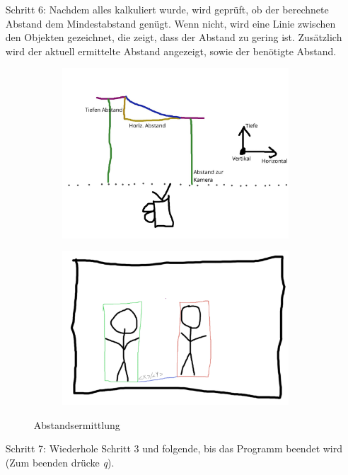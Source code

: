 \documentclass[12pt]{article}
\theoremstyle{definition}
\begin{document}
\begin{flushleft}
\begin{enumerate}
\item[Schritt 6:] Nachdem alles kalkuliert wurde, wird geprüft, ob der berechnete Abstand dem Mindestabstand genügt. Wenn nicht, wird eine Linie zwischen den Objekten gezeichnet, die zeigt, dass der Abstand zu gering ist. Zusätzlich wird der aktuell ermittelte Abstand angezeigt, sowie der benötigte Abstand.

\begin{figure}[h]
\begin{subfigure}[t]{0.5\textwidth}
	\centering
	\includegraphics[scale=0.45]{Abstand_kalk}
\end{subfigure}%
\begin{subfigure}[t]{0.5\textwidth}
	\centering
	\includegraphics[scale=0.25]{step3}
\end{subfigure}%
\caption{Abstandsermittlung}
\end{figure}

\item[Schritt 7:] Wiederhole Schritt 3 und folgende, bis das Programm beendet wird (Zum beenden drücke \textit{q}).
\end{enumerate}
\end{flushleft}
\end{document}
